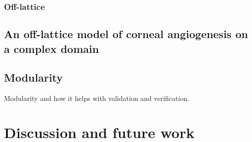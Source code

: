 \documentclass[superscriptaddress, a4paper]{article}
\begin{document}
\subsubsection{Off-lattice}
\label{sec:off-lattice vascular tumour growth}


\subsection{An off-lattice model of corneal angiogenesis on a complex domain}
\label{sec:an off-lattice model of corneal angiogenesis on a complex domain}


\subsection{Modularity}
\label{sec:modularity}

Modularity and how it helps with validation and verification.

\section{Discussion and future work}
\label{sec:discussion and future work}
\end{document}
